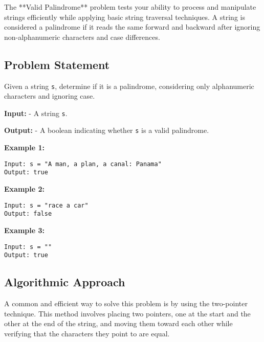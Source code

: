 
\label{problem:Valid_Palindrome}

The **Valid Palindrome** problem tests your ability to process and manipulate strings efficiently while applying basic string traversal techniques. A string is considered a palindrome if it reads the same forward and backward after ignoring non-alphanumeric characters and case differences.

\subsection*{Problem Statement}
Given a string \texttt{s}, determine if it is a palindrome, considering only alphanumeric characters and ignoring case.

\textbf{Input:}
- A string \texttt{s}.

\textbf{Output:}
- A boolean indicating whether \texttt{s} is a valid palindrome.

\textbf{Example 1:}
\begin{verbatim}
Input: s = "A man, a plan, a canal: Panama"
Output: true
\end{verbatim}

\textbf{Example 2:}
\begin{verbatim}
Input: s = "race a car"
Output: false
\end{verbatim}

\textbf{Example 3:}
\begin{verbatim}
Input: s = ""
Output: true
\end{verbatim}

\subsection*{Algorithmic Approach}

A common and efficient way to solve this problem is by using the two-pointer technique. This method involves placing two pointers, one at the start and the other at the end of the string, and moving them toward each other while verifying that the characters they point to are equal.

